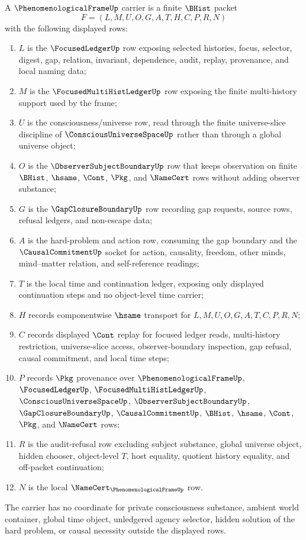 \begin{definition}
\label{def:phenomenological-frame-carrier}
A $\PhenomenologicalFrameUp$ carrier is a finite $\BHist$ packet
$$
F=(L,M,U,O,G,A,T,H,C,P,R,N)
$$
with the following displayed rows:
\begin{enumerate}
\item $L$ is the $\FocusedLedgerUp$ row exposing selected histories, focus, selector, digest, gap, relation, invariant, dependence, audit, replay, provenance, and local naming data;
\item $M$ is the $\FocusedMultiHistLedgerUp$ row exposing the finite multi-history support used by the frame;
\item $U$ is the consciousness/universe row, read through the finite universe-slice discipline of $\ConsciousUniverseSpaceUp$ rather than through a global universe object;
\item $O$ is the $\ObserverSubjectBoundaryUp$ row that keeps observation on finite $\BHist$, $\hsame$, $\Cont$, $\Pkg$, and $\NameCert$ rows without adding observer substance;
\item $G$ is the $\GapClosureBoundaryUp$ row recording gap requests, source rows, refusal ledgers, and non-escape data;
\item $A$ is the hard-problem and action row, consuming the gap boundary and the $\CausalCommitmentUp$ socket for action, causality, freedom, other minds, mind--matter relation, and self-reference readings;
\item $T$ is the local time and continuation ledger, exposing only displayed continuation steps and no object-level time carrier;
\item $H$ records componentwise $\hsame$ transport for $L,M,U,O,G,A,T,C,P,R,N$;
\item $C$ records displayed $\Cont$ replay for focused ledger reads, multi-history restriction, universe-slice access, observer-boundary inspection, gap refusal, causal commitment, and local time steps;
\item $P$ records $\Pkg$ provenance over $\PhenomenologicalFrameUp$, $\FocusedLedgerUp$, $\FocusedMultiHistLedgerUp$, $\ConsciousUniverseSpaceUp$, $\ObserverSubjectBoundaryUp$, $\GapClosureBoundaryUp$, $\CausalCommitmentUp$, $\BHist$, $\hsame$, $\Cont$, $\Pkg$, and $\NameCert$ rows;
\item $R$ is the audit-refusal row excluding subject substance, global universe object, hidden chooser, object-level $T$, host equality, quotient history equality, and off-packet continuation;
\item $N$ is the local $\NameCert_{\PhenomenologicalFrameUp}$ row.
\end{enumerate}
The carrier has no coordinate for private consciousness substance, ambient world container, global time object, unledgered agency selector, hidden solution of the hard problem, or causal necessity outside the displayed rows.
\end{definition}

